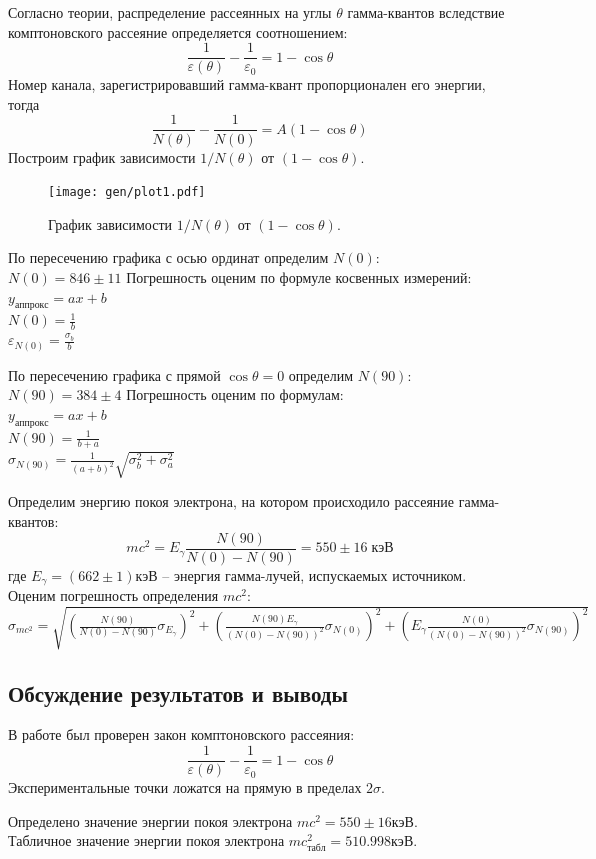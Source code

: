 \documentclass[10pt,a4paper]{article}
\begin{document}
	Согласно теории, распределение рассеянных на углы $\theta$ гамма-квантов вследствие комптоновского рассеяние определяется соотношением: 
	$$
	\frac{1}{\varepsilon(\theta)} - \frac{1}{\varepsilon_0} = 1 - \cos \theta
	$$
	Номер канала, зарегистрировавший гамма-квант пропорционален его энергии, тогда
	$$
	\frac{1}{N(\theta)} - \frac{1}{N(0)} = A (1 - \cos \theta)
	$$
	Построим график зависимости $1/N(\theta)$ от $(1 - \cos \theta)$.\\
	\begin{figure}
		\centering
		\texttt{[image: gen/plot1.pdf]}
		\caption{График зависимости $1/N(\theta)$ от $(1 - \cos \theta)$.}
	\end{figure}

	По пересечению графика с осью ординат определим $N(0)$:\\
	$N(0) = 846 \pm 11$
	Погрешность оценим по формуле косвенных измерений: \\
	$y_{аппрокс} = ax + b$\\
	$N(0) = \frac{1}{b}$\\
	$\varepsilon_{N(0)} = \frac{\sigma_b}{b}$
	
	По пересечению графика с прямой $\cos \theta = 0$ определим $N(90)$:\\
	$N(90) = 384 \pm 4$
	Погрешность оценим по формулам: \\
	$y_{аппрокс} = ax + b$\\
	$N(90) = \frac{1}{b + a}$ \\
	$\sigma_{N(90)} = \frac{1}{(a + b)^2}\sqrt{\sigma_b^2 + \sigma_a^2}$
	
	Определим энергию покоя электрона, на котором происходило рассеяние гамма-квантов: \\
	$$
	mc^2 = E_\gamma \frac{N(90)}{N(0) - N(90)} = 550 \pm 16 \; кэВ
	$$
	где $E_\gamma = (662\pm1) кэВ$ -- энергия гамма-лучей, испускаемых источником. Оценим погрешность определения $mc^2$:\\
	$\sigma_{mc^2} = \sqrt{(\frac{N(90)}{N(0) - N(90)} \sigma_{E_\gamma})^2 + (\frac{N(90) E_\gamma}{(N(0) - N(90))^2} \sigma_{N(0)})^2 + (E_\gamma \frac{N(0)}{(N(0) - N(90))^2}\sigma_{N(90)})^2}$
	
	\subsection*{Обсуждение результатов и выводы}
	
	В работе был проверен закон комптоновского рассеяния:
	$$
	\frac{1}{\varepsilon(\theta)} - \frac{1}{\varepsilon_0} = 1 - \cos \theta
	$$
	Экспериментальные точки ложатся на прямую в пределах $2\sigma$.
	
	Определено значение энергии покоя электрона $mc^2 = 550 \pm 16 кэВ$. \\
	Табличное значение энергии покоя электрона $mc^2_{табл} = 510.998 кэВ$.
	
\end{document}
